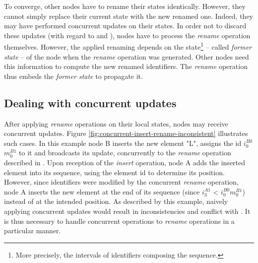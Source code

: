 \documentclass[10pt,journal,compsoc]{IEEEtran}
\newcommand{\trm}[1]{\mathit{#1}}
\newcommand{\id}[3]{$\trm{#1}^{\trm{#2}}_{\trm{#3}}$}
\begin{document}
To converge, other nodes have to rename their states identically.
However, they cannot simply replace their current state with the new renamed one.
Indeed, they may have performed concurrent updates on their states.
In order not to discard these updates (with regard to  and ), nodes have to process the \emph{rename} operation themselves.
However, the applied renaming depends on the state\footnote{More precisely, the intervals of identifiers composing the sequence.} -- called \emph{former state} -- of the node when the \emph{rename} operation was generated.
Other nodes need this information to compute the new renamed identifiers.
The \emph{rename} operation thus embeds the \emph{former state} to propagate it.

\subsection{Dealing with concurrent updates}

\label{sec:dealing-with-concurrent-updates}

After applying \emph{rename} operations on their local states, nodes may receive concurrent updates.
Figure \ref{fig:concurrent-insert-rename-inconsistent} illustrates such cases.
In this example node B inserts the new element "L", assigns the id \id{i}{B0}{0}\id{m}{B1}{0} to it and broadcasts its update, concurrently to the \emph{rename} operation described in .
Upon reception of the \emph{insert} operation, node A adds the inserted element into its sequence, using the element id to determine its position.
However, since identifiers were modified by the concurrent \emph{rename} operation, node A inserts the new element at the end of its sequence (since \id{i}{A1}{3} < \id{i}{B0}{0}\id{m}{B1}{0}) instead of at the intended position.
As described by this example, naively applying concurrent updates would result in inconsistencies and conflict with .
It is thus necessary to handle concurrent operations to \emph{rename} operations in a particular manner.
\end{document}
